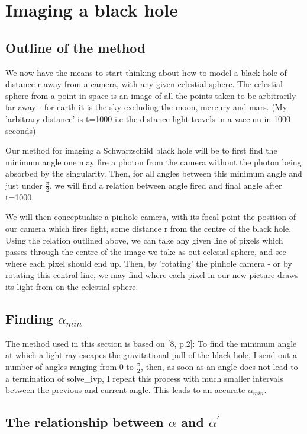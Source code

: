 \documentclass[oneside,openright,frontopenright]{dmathesis}
\begin{document}
\chapter{Imaging a black hole}
\section{Outline of the method}

	We now have the means to start thinking about how to model a black hole of distance r away from a camera, with any given celestial sphere. The celestial sphere from a point in space is an image of all the points taken to be arbitrarily far away - for earth it is the sky excluding the moon, mercury and mars. (My 'arbitrary distance' is t=1000 i.e the distance light travels in a vaccum in 1000 seconds)

	Our method for imaging a Schwarzschild black hole will be to first find the minimum angle one may fire a photon from the camera without the photon being absorbed by the singularity. Then, for all angles between this minimum angle and just under $\frac{\pi}{2}$, we will find a relation between angle fired and final angle after t=1000.

	We will then conceptualise a pinhole camera, with its focal point the position of our camera which fires light, some distance r from the centre of the black hole. Using the relation outlined above, we can take any given line of pixels which passes through the centre of the image we take as out celesial sphere, and see where each pixel should end up. Then, by 'rotating' the pinhole camera - or by rotating this central line, we may find where each pixel in our new picture draws its light from on the celestial sphere.

\section{Finding $\alpha_{min}$}
	
	The method used in this section is based on [8, p.2]: To find the minimum angle at which a light ray escapes the gravitational pull of the black hole, I send out a number of angles ranging from 0 to $\frac{\pi}{2}$, then, as soon as an angle does not lead to a termination of solve\_ivp, I repeat this process with much smaller intervals between the previous and current angle. This leads to an accurate $\alpha_{min}$.

\section{The relationship between $\alpha$ and $\alpha^{'}$}
\end{document}
